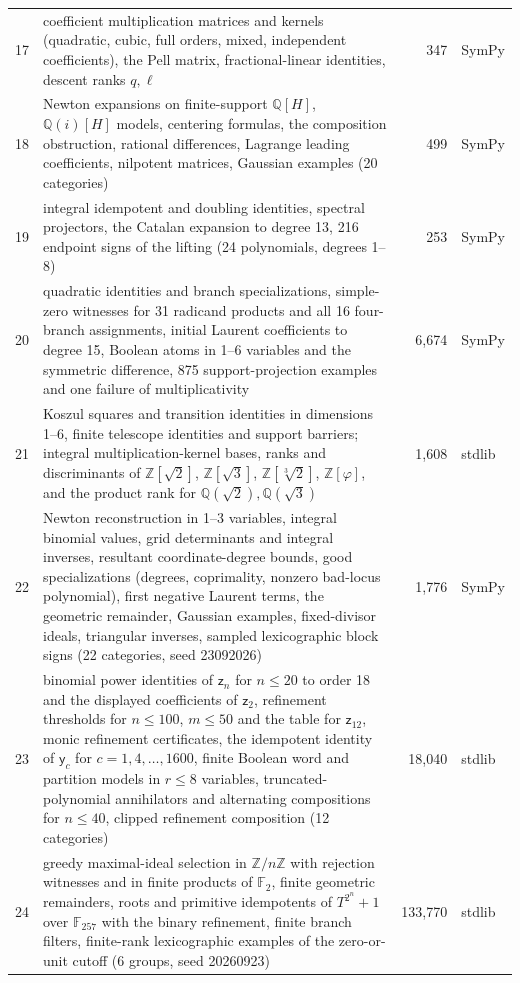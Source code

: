 \documentclass[11pt,letterpaper]{article}
\numberwithin{equation}{section}
\theoremstyle{definition}
\theoremstyle{remark}
\theoremstyle{plain}
\newcommand{\Z}{\mathbb Z}
\newcommand{\Q}{\mathbb Q}
\newcommand{\F}{\mathbb F}
\begin{document}
\begin{longtable}{@{}l>{\raggedright\arraybackslash}p{}rl@{}}
17 & coefficient multiplication matrices and kernels (quadratic, cubic, full orders, mixed, independent coefficients), the Pell matrix, fractional-linear identities, descent ranks $q,\ell$ & 347 & SymPy\\
18 & Newton expansions on finite-support $\Q[H]$, $\Q(i)[H]$ models, centering formulas, the composition obstruction, rational differences, Lagrange leading coefficients, nilpotent matrices, Gaussian examples (20 categories) & 499 & SymPy\\
19 & integral idempotent and doubling identities, spectral projectors, the Catalan expansion to degree 13, 216 endpoint signs of the lifting (24 polynomials, degrees 1--8) & 253 & SymPy\\
20 & quadratic identities and branch specializations, simple-zero witnesses for 31 radicand products and all 16 four-branch assignments, initial Laurent coefficients to degree 15, Boolean atoms in 1--6 variables and the symmetric difference, 875 support-projection examples and one failure of multiplicativity & 6{,}674 & SymPy\\
21 & Koszul squares and transition identities in dimensions 1--6, finite telescope identities and support barriers; integral multiplication-kernel bases, ranks and discriminants of $\Z[\sqrt2]$, $\Z[\sqrt3]$, $\Z[\sqrt[3]2]$, $\Z[\varphi]$, and the product rank for $\Q(\sqrt2),\Q(\sqrt3)$ & 1{,}608 & stdlib\\
22 & Newton reconstruction in 1--3 variables, integral binomial values, grid determinants and integral inverses, resultant coordinate-degree bounds, good specializations (degrees, coprimality, nonzero bad-locus polynomial), first negative Laurent terms, the geometric remainder, Gaussian examples, fixed-divisor ideals, triangular inverses, sampled lexicographic block signs (22 categories, seed 23092026) & 1{,}776 & SymPy\\
23 & binomial power identities of $\mathsf z_n$ for $n\le20$ to order 18 and the displayed coefficients of $\mathsf z_2$, refinement thresholds for $n\le100$, $m\le50$ and the table for $\mathsf z_{12}$, monic refinement certificates, the idempotent identity of $\mathsf y_c$ for $c=1,4,\dots,1600$, finite Boolean word and partition models in $r\le8$ variables, truncated-polynomial annihilators and alternating compositions for $n\le40$, clipped refinement composition (12 categories) & 18{,}040 & stdlib\\
24 & greedy maximal-ideal selection in $\Z/n\Z$ with rejection witnesses and in finite products of $\F_2$, finite geometric remainders, roots and primitive idempotents of $T^{2^n}+1$ over $\F_{257}$ with the binary refinement, finite branch filters, finite-rank lexicographic examples of the zero-or-unit cutoff (6 groups, seed 20260923) & 133{,}770 & stdlib\\

\end{longtable}
\end{document}
